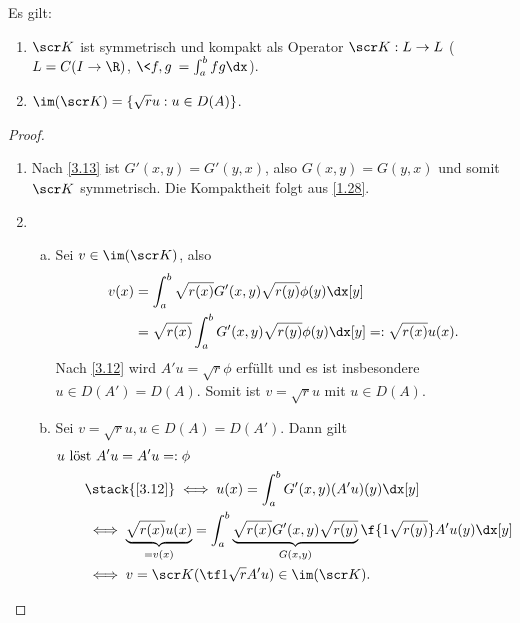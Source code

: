 \begin{lem} \label{3.18} Es gilt:
	\begin{enumerate}[1)]
		\item
			$\scr K$ ist symmetrisch und kompakt als Operator $\scr K : L \to L$ ($L = C(I \to \R)$, $\<f,g\> = \int_a^b fg \dx$).
		\item
			$\im(\scr K) = \{\sqrt{r} u : u \in D(A)\}$.
	\end{enumerate}
	\begin{proof}
		\begin{enumerate}[1)]
			\item
				Nach \ref{3.13} ist $G'(x,y) = G'(y,x)$, also $G(x,y) = G(y,x)$ und somit $\scr K$ symmetrisch.
				Die Kompaktheit folgt aus \ref{1.28}.
			\item
				\begin{enumerate}[a)]
					\item
						Sei $v \in \im(\scr K)$, also
						\begin{align*}
							v(x) 
							&= \int_a^b \sqrt{r(x)} G'(x,y) \sqrt{r(y)} \phi(y) \dx[y] \\
							&= \sqrt{r(x)} \int_a^b G'(x,y) \sqrt{r(y)} \phi(y) \dx[y] =: \sqrt{r(x)} u(x).
						\end{align*}
						Nach \ref{3.12} wird $A'u= \sqrt{r} \phi$ erfüllt und es ist insbesondere $u \in  D(A') = D(A)$.
						Somit ist $v = \sqrt{r} u$ mit $u \in D(A)$.
					\item
						Sei $v = \sqrt{r} u, u \in D(A) = D(A')$. Dann gilt
						\begin{align*}
							&\text{$u$ löst $A'u = A'u =: \phi$} \\
							&\qquad \stack{\ref{3.12}}\iff u(x) = \int_a^b G'(x,y) (A'u)(y) \dx[y] \\
							&\qquad \iff \underbrace{\sqrt{r(x)}  u(x)}_{=v(x)} = \int_a^b \underbrace{\sqrt{r(x)} G'(x,y) \sqrt{r(y)}}_{G(x,y)} \f{1{\sqrt{r(y)}}} A'u(y) \dx[y] \\
							&\qquad \iff v = \scr K (\tf 1{\sqrt{r}}A'u) \in \im (\scr K).
						\end{align*}
				\end{enumerate}
		\end{enumerate}
	\end{proof}
\end{lem}

